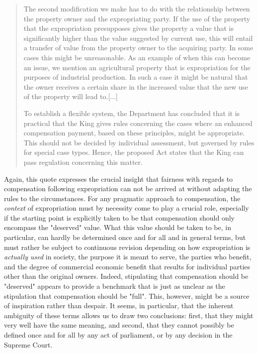 \documentclass[10pt]{article} %
\begin{document}
\begin{quote}
The second modification we make has to do with the relationship between the property owner and the expropriating party. If the use of the property that the expropriation presupposes gives the property a value that is significantly higher than the value suggested by current use, this will entail a transfer of value from the property owner to the acquiring party. In some cases this might be unreasonable. As an example of when this can become an issue, we mention an agricultural property that is expropriation for the purposes of industrial production. In such a case it might be natural that the owner receives a certain share in the increased value that the new use of the property will lead to.[...] %

To establish a flexible system, the Department has concluded that it is practical that the King gives rules concerning the cases where an enhanced compensation payment, based on these principles, might be appropriate. This should not be decided by individual assessment, but governed by rules for special case types. Hence, the proposed Act states that the King can pass regulation concerning this matter.
\end{quote}

Again, this quote expresses the crucial insight that fairness with regards to compensation following expropriation can not be arrived at without adapting the rules to the circumstances. For any pragmatic approach to compensation, the \emph{context} of expropriation must by necessity come to play a crucial role, especially if the starting point is explicitly taken to be that compensation should only encompass the "deserved" value. What this value should be taken to be, in particular, can hardly be determined once and for all and in general terms, but must rather be subject to continuous revision depending on how expropriation is \emph{actually used} in society, the purpose it is meant to serve, the parties who benefit, and the degree of commercial economic benefit that results for individual parties other than the original owners. Indeed, stipulating that compensation should be "deserved" appears to provide a benchmark that is just as unclear as the stipulation that compensation should be "full". This, however, might be a source of inspiration rather than despair. It seems, in particular, that the inherent ambiguity of these terms allows us to draw two conclusions: first, that they might very well have the same meaning, and second, that they cannot possibly be defined once 
and for all by any act of parliament, or by any decision in the Supreme Court.
\end{document}
